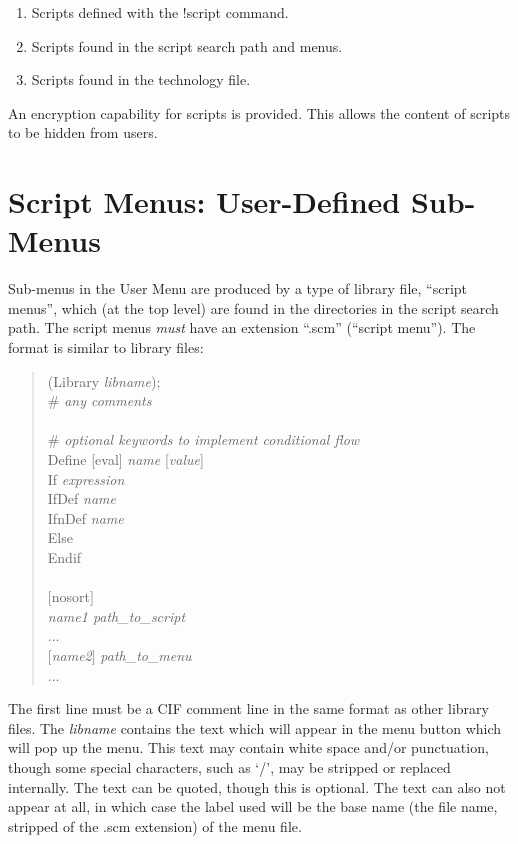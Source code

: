 \begin{enumerate}
\item{Scripts defined with the {\cb !script} command.}
\item{Scripts found in the script search path and menus.}
\item{Scripts found in the technology file.}
\end{enumerate}

An encryption capability for scripts is provided.  This allows the
content of scripts to be hidden from users.


\section{Script Menus: User-Defined Sub-Menus}

Sub-menus in the {\cb User Menu} are produced by a type of library
file, ``script menus'', which (at the top level) are found in the
directories in the script search path.  The script menus {\it must}
have an extension ``{\vt .scm}'' (``script menu'').  The format is
similar to library files:

\begin{quote}
    {\vt (Library {\it libname\/});}\\
    {\vt \#} {\it any comments}\\
    \\
    {\vt \#} {\it optional keywords to implement conditional flow}\\
    {\vt Define} [{\vt eval}] {\it name} [{\it value\/}]\\
    {\vt If} {\it expression}\\
    {\vt IfDef} {\it name}\\
    {\vt IfnDef} {\it name}\\
    {\vt Else}\\
    {\vt Endif}\\
    \\
    $[${\vt nosort}$]$\\
    {\it name1   path\_to\_script}\\
    ...\\
    $[${\it name2\/}$]$   {\it path\_to\_menu}\\
    ...
\end{quote}

The first line must be a CIF comment line in the same format as other
library files.  The {\it libname} contains the text which will appear
in the menu button which will pop up the menu.  This text may contain
white space and/or punctuation, though some special characters, such
as `/', may be stripped or replaced internally.  The text can be
quoted, though this is optional.  The text can also not appear at all,
in which case the label used will be the base name (the file name,
stripped of the {\vt .scm} extension) of the menu file.

